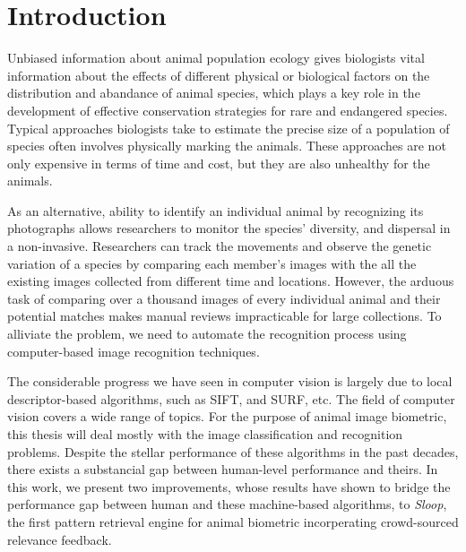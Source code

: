 
\chapter{Introduction}

Unbiased information about animal population ecology gives biologists vital
information about the effects of different physical or biological factors on
the distribution and abandance of animal species, which plays a key role in the
development of effective conservation strategies for rare and endangered
species. Typical approaches biologists take to estimate the precise size of a
population of species often involves physically marking the animals. These
approaches are not only expensive in terms of time and cost, but they are also
unhealthy for the animals.

As an alternative, ability to identify an individual animal by recognizing its
photographs allows researchers to monitor the species' diversity, and dispersal
in a non-invasive. Researchers can track the movements and observe the genetic
variation of a species by comparing each member's images with the all the
existing images collected from different time and locations. However, the
arduous task of comparing over a thousand images of every individual animal and
their potential matches makes manual reviews impracticable for large
collections. To alliviate the problem, we need to automate the recognition
process using computer-based image recognition techniques.

The considerable progress we have seen in computer vision is largely due to
local descriptor-based algorithms, such as SIFT\cite{lowe04}, and
SURF\cite{surf08}, etc. The field of computer vision covers a wide range of
topics. For the purpose of animal image biometric, this thesis will deal mostly
with the image classification and recognition problems. Despite the stellar
performance of these algorithms in the past decades, there exists a substancial
gap between human-level performance and theirs. In this work, we present two
improvements, whose results have shown to bridge the performance gap between
human and these machine-based algorithms, to \emph{Sloop}, the first pattern
retrieval engine for animal biometric incorperating crowd-sourced relevance
feedback.

